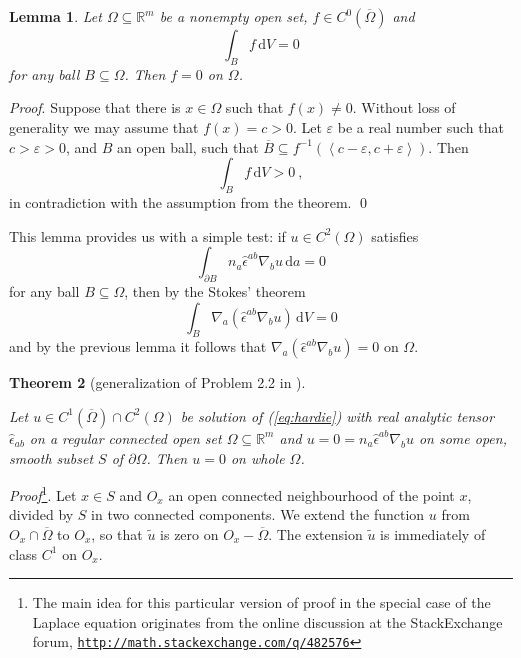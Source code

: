 \documentclass[12pt]{iopart}
\newcommand{\dd}{\partial}
\newcommand{\nab}[1]{\nabla_{\! #1}}
\newcommand{\vol}{\df V}
\newcommand{\veps}{\varepsilon}
\newcommand{\df}{\mathrm{d}}
\newcommand{\be}{\begin{equation}}
\newcommand{\ee}{\end{equation}}
\newcommand{\0}{\vct{0}}
\newcommand{\lb}{\left<}
\newcommand{\rb}{\right>}
\newcommand{\rr}{\mathds{R}}
\newcommand{\cl}[1]{\overline{#1}}
\theoremstyle{plain} \newtheorem{tm}{Theorem}[section]
\theoremstyle{plain} \newtheorem{lm}[tm]{Lemma}
\theoremstyle{definition} \newtheorem{defn}[tm]{Definition}
\newcommand{\btm}{\begin{tm}}
\newcommand{\etm}{\end{tm}}
\newcommand{\blm}{\begin{lm}}
\newcommand{\elm}{\end{lm}}
\begin{document}

\medskip



\blm
Let $\Omega \subseteq \rr^m$ be a nonempty open set, $f \in C^0(\cl{\Omega})$ and
\be
\int_B f \, \vol = 0
\ee
for any ball $B \subseteq \Omega$. Then $f = 0$ on $\Omega$.
\elm

\noindent
\emph{Proof}. Suppose that there is $x \in \Omega$ such that $f(x) \ne 0$. Without loss of generality we may assume that $f(x) = c > 0$. Let $\veps$ be a real number such that $c > \veps > 0$, and $B$ an open ball, such that $\cl{B} \subseteq f^{-1}(\lb c-\veps, c+\veps \rb)$. Then
\be
\int_B f \, \vol > 0 \ ,
\ee
in contradiction with the assumption from the theorem. \qed

\medskip

This lemma provides us with a simple test: if $u \in C^2(\Omega)$ satisfies
\be
\int_{\dd B} n_a \hat{\epsilon}^{ab} \nab{b} u \, \df a = 0
\ee
for any ball $B \subseteq \Omega$, then by the Stokes' theorem
\be
\int_B \nab{a} (\hat{\epsilon}^{ab} \nab{b} u) \, \vol = 0
\ee
and by the previous lemma it follows that $\nab{a} (\hat{\epsilon}^{ab} \nab{b} u) = 0$ on $\Omega$.

\medskip



\btm[generalization of Problem 2.2 in \cite{GT}] \label{tm:CauchyEllipt}

Let $u \in C^1(\cl{\Omega}) \cap C^2(\Omega)$ be solution of (\ref{eq:hardie}) with real analytic tensor $\hat{\epsilon}_{ab}$ on a regular connected open set $\Omega \subseteq \rr^m$ and $u = 0 = n_a \hat{\epsilon}^{ab} \nab{b} u$ on some open, smooth subset $S$ of $\dd\Omega$. Then $u = 0$ on whole $\Omega$.
\etm

\noindent
\emph{Proof}\footnote{The main idea for this particular version of proof in the special case of the Laplace equation originates from the online discussion at the StackExchange forum, \href{http://math.stackexchange.com/q/482576}{\texttt{http://math.stackexchange.com/q/482576}}}. Let $x \in S$ and $O_x$ an open connected neighbourhood of the point $x$, divided by $S$ in two connected components. We extend the function $u$ from $O_x \cap \cl{\Omega}$ to $O_x$, so that $\tilde{u}$ is zero on $O_x - \cl{\Omega}$. The extension $\tilde{u}$ is immediately of class $C^1$ on $O_x$.
\end{document}
